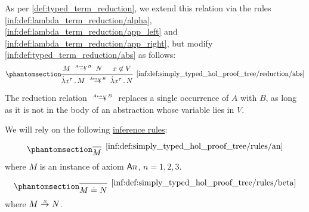 \begin{definition}
\begin{thmenum}[series=def:simply_typed_hol_proof_tree]
    As per \cref{def:typed_term_reduction}, we extend this relation via the rules \ref{inf:def:lambda_term_reduction/alpha}, \ref{inf:def:lambda_term_reduction/app_left} and \ref{inf:def:lambda_term_reduction/app_right}, but modify \ref{inf:def:typed_term_reduction/abs} as follows:
    \begin{equation*}\taglabel[\ensuremath{ \logic{Abs}_{A \mapsto_V B} }]{inf:def:simply_typed_hol_proof_tree/reduction/abs}
      \begin{prooftree}
        \hypo{ M \redrel{A \mapsto_V B} N }
        \hypo{ x \not\in V }
        \infer2[\ref{inf:def:simply_typed_hol_proof_tree/reduction/abs}]{ \qabs {x^\tau} M \redrel{A \mapsto_V B} \qabs {x^\tau} N }.
      \end{prooftree}
    \end{equation*}

    The reduction relation \( {\redrel{A \mapsto_V B}} \) replaces a single occurrence of \( A \) with \( B \), as long as it is not in the body of an abstraction whose variable lies in \( V \).

     We will rely on the following \hyperref[def:inference_rule]{inference rules}:
    \begin{paracol}{3}
      \begin{nthcolumn}{0}
        \ParacolAlignmentHack
        \begin{equation*}\taglabel[\ensuremath{ \logic{A}_n }]{inf:def:simply_typed_hol_proof_tree/rules/an}
          \begin{prooftree}
            \infer0[\ref{inf:def:simply_typed_hol_proof_tree/rules/an}]{ M },
          \end{prooftree}
        \end{equation*}
        where \( M \) is an instance of axiom \( \textsf{A}n \), \( n = 1, 2, 3 \).
      \end{nthcolumn}

      \begin{nthcolumn}{1}
        \ParacolAlignmentHack
        \begin{equation*}\taglabel[\ensuremath{ \logic{A}_4 }]{inf:def:simply_typed_hol_proof_tree/rules/beta}
          \begin{prooftree}
            \infer0[\ref{inf:def:simply_typed_hol_proof_tree/rules/beta}]{ M \syneq N },
          \end{prooftree}
        \end{equation*}
        where \( M \bred N \).
      \end{nthcolumn}


\end{paracol}
\end{thmenum}
\end{definition}
